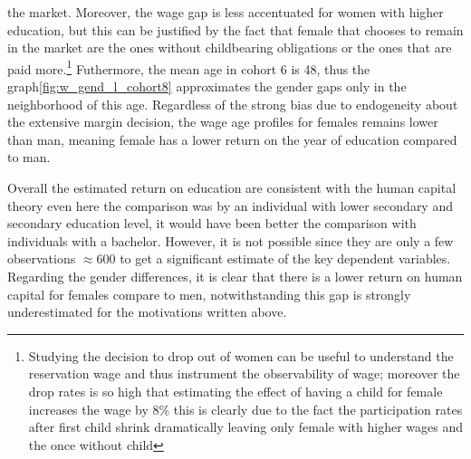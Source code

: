 \documentclass[12pt]{article}
\begin{document}
the market. Moreover, the wage gap is less accentuated for women with higher education, but this can be justified by the
fact that female that chooses to remain in the market are the ones without childbearing obligations or the ones that are
paid more.\footnote{Studying the decision to drop out of women can be useful to understand the reservation wage and thus
instrument the observability of wage; moreover the drop rates is so high that estimating the effect of having a child
for female increases the wage by 8\% this is clearly due to the fact the participation rates after first child
shrink dramatically leaving only female with higher wages and the once without child } Futhermore, the mean age in
cohort 6 is 48, thus the graph\ref{fig:w_gend_l_cohort8} approximates the gender gaps only in the neighborhood of this
age. Regardless of the strong bias due to endogeneity about the extensive margin decision, the wage age profiles for
females remains lower than man, meaning female has a lower return on the year of education compared to man.
\par
Overall the estimated return on education are consistent with the human capital theory even here the comparison was by
an individual with lower secondary and secondary education level, it would have been better the comparison with individuals
with a bachelor. However, it is not possible since they are only a few observations $\approx 600$ to get a significant
estimate of the key dependent variables. Regarding the gender differences, it is clear that there is a lower return on
human capital for females compare to men, notwithstanding this gap is strongly underestimated for the motivations written
above.
\end{document}
